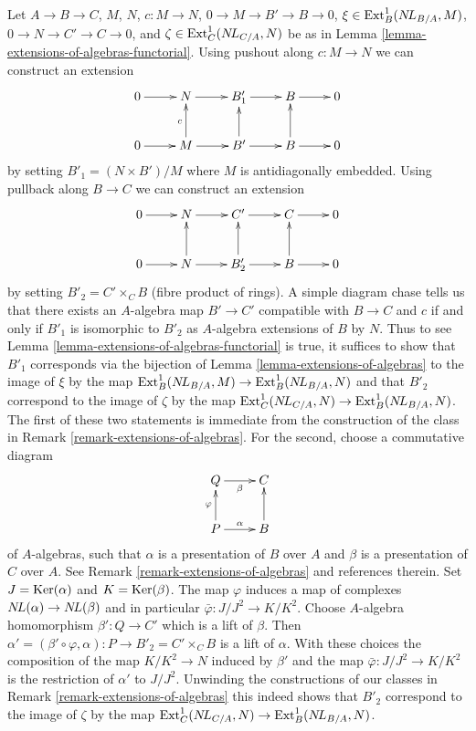 \begin{remark}
\label{remark-extensions-of-algebras-functorial}
Let $A \to B \to C$, $M$, $N$, $c : M \to N$,
$0 \to M \to B' \to B \to 0$, $\xi \in \mathop{\mathrm{Ext}}\nolimits^1_B(\mathop{N\!L}\nolimits_{B/A}, M)$,
$0 \to N \to C' \to C \to 0$, and $\zeta \in \mathop{\mathrm{Ext}}\nolimits^1_C(\mathop{N\!L}\nolimits_{C/A}, N)$ be as in
Lemma \ref{lemma-extensions-of-algebras-functorial}.
Using pushout along $c : M \to N$ we can construct an extension
$$
\xymatrix{
0 \ar[r] & N \ar[r] & B'_1 \ar[r] & B \ar[r] & 0 \\
0 \ar[r] & M \ar[u]^c \ar[r] & B' \ar[u] \ar[r] & B \ar[u] \ar[r] & 0
}
$$
by setting $B'_1 = (N \times B')/M$ where $M$ is antidiagonally
embedded. Using pullback along $B \to C$ we can construct an extension
$$
\xymatrix{
0 \ar[r] & N \ar[r] & C' \ar[r] & C \ar[r] & 0 \\
0 \ar[r] & N \ar[u] \ar[r] & B'_2 \ar[u] \ar[r] & B \ar[u] \ar[r] & 0
}
$$
by setting $B'_2 = C' \times_C B$ (fibre product of rings). A simple diagram
chase tells us that there exists an $A$-algebra map $B' \to C'$
compatible with $B \to C$ and $c$ if and only if $B'_1$ is isomorphic
to $B'_2$ as $A$-algebra extensions of $B$ by $N$. Thus to see
Lemma \ref{lemma-extensions-of-algebras-functorial}
is true, it suffices to show that $B'_1$ corresponds via the bijection of
Lemma \ref{lemma-extensions-of-algebras}
to the image of $\xi$ by the map
$\mathop{\mathrm{Ext}}\nolimits^1_B(\mathop{N\!L}\nolimits_{B/A}, M) \to \mathop{\mathrm{Ext}}\nolimits^1_B(\mathop{N\!L}\nolimits_{B/A}, N)$
and that $B'_2$ correspond to the image of $\zeta$ by the map
$\mathop{\mathrm{Ext}}\nolimits^1_C(\mathop{N\!L}\nolimits_{C/A}, N) \to \mathop{\mathrm{Ext}}\nolimits^1_B(\mathop{N\!L}\nolimits_{B/A}, N)$.
The first of these two statements is immediate from the construction
of the class in Remark \ref{remark-extensions-of-algebras}.
For the second, choose a commutative diagram
$$
\xymatrix{
Q \ar[r]_\beta & C \\
P \ar[u]^\varphi \ar[r]^\alpha & B \ar[u]
}
$$
of $A$-algebras, such that $\alpha$ is a presentation of $B$ over $A$
and $\beta$ is a presentation of $C$ over $A$. See
Remark \ref{remark-extensions-of-algebras} and references therein.
Set $J = \mathop{\mathrm{Ker}}(\alpha)$ and $K = \mathop{\mathrm{Ker}}(\beta)$. The map $\varphi$
induces a map of complexes $\mathop{N\!L}\nolimits(\alpha) \to \mathop{N\!L}\nolimits(\beta)$
and in particular $\bar\varphi : J/J^2 \to K/K^2$.
Choose $A$-algebra homomorphism $\beta' : Q \to C'$
which is a lift of $\beta$. Then
$\alpha' = (\beta' \circ \varphi, \alpha) : P \to B'_2 = C' \times_C B$
is a lift of $\alpha$. With these choices the composition of the map
$K/K^2 \to N$ induced by $\beta'$ and the map $\bar\varphi : J/J^2 \to K/K^2$
is the restriction of $\alpha'$ to $J/J^2$.
Unwinding the constructions of our classes in
Remark \ref{remark-extensions-of-algebras}
this indeed shows that
$B'_2$ correspond to the image of $\zeta$ by the map
$\mathop{\mathrm{Ext}}\nolimits^1_C(\mathop{N\!L}\nolimits_{C/A}, N) \to \mathop{\mathrm{Ext}}\nolimits^1_B(\mathop{N\!L}\nolimits_{B/A}, N)$.
\end{remark}

